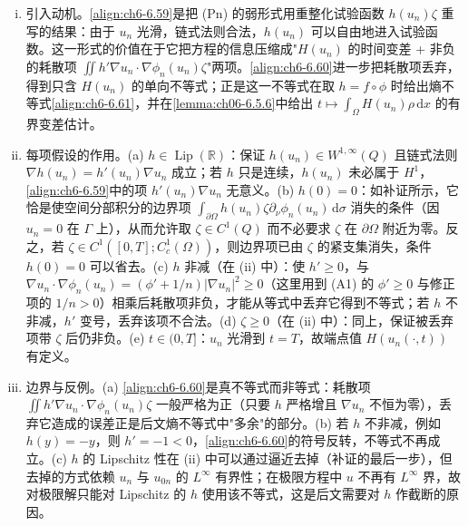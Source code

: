 \documentclass[../../main.tex]{subfiles}%
\begin{document}
\begin{remark}\label{remark:ch06-6.5.4动机}
\begin{enumerate}[(i)]
\item 引入动机。\eqref{align:ch6-6.59}是把 (Pn) 的弱形式用重整化试验函数 $h(u_n)\zeta$ 重写的结果：由于 $u_n$ 光滑，链式法则合法，$h(u_n)$ 可以自由地进入试验函数。这一形式的价值在于它把方程的信息压缩成"$H(u_n)$ 的时间变差 + 非负的耗散项 $\iint h'\nabla u_n\cdot\nabla\phi_n(u_n)\zeta$"两项。\eqref{align:ch6-6.60}进一步把耗散项丢弃，得到只含 $H(u_n)$ 的单向不等式；正是这一不等式在取 $h=f\circ\phi$ 时给出熵不等式\eqref{align:ch6-6.61}，并在\cref{lemma:ch06-6.5.6}中给出 $t\mapsto\int_\Omega H(u_n)\rho\,\mathrm{d}x$ 的有界变差估计。
\item 每项假设的作用。(a) $h\in\operatorname{Lip}(\mathbb{R})$：保证 $h(u_n)\in W^{1,\infty}(Q)$ 且链式法则 $\nabla h(u_n)=h'(u_n)\nabla u_n$ 成立；若 $h$ 只是连续，$h(u_n)$ 未必属于 $H^1$，\eqref{align:ch6-6.59}中的项 $h'(u_n)\nabla u_n$ 无意义。(b) $h(0)=0$：如补证所示，它恰是使空间分部积分的边界项 $\int_{\partial\Omega}h(u_n)\zeta\partial_\nu\phi_n(u_n)\,\mathrm{d}\sigma$ 消失的条件（因 $u_n=0$ 在 $\Gamma$ 上），从而允许取 $\zeta\in C^1(Q)$ 而不必要求 $\zeta$ 在 $\partial\Omega$ 附近为零。反之，若 $\zeta\in C^1([0,T];C^1_c(\Omega))$，则边界项已由 $\zeta$ 的紧支集消失，条件 $h(0)=0$ 可以省去。(c) $h$ 非减（在 (ii) 中）：使 $h'\geqslant0$，与 $\nabla u_n\cdot\nabla\phi_n(u_n)=(\phi'+1/n)|\nabla u_n|^2\geqslant0$（这里用到 (A1) 的 $\phi'\geqslant0$ 与修正项的 $1/n>0$）相乘后耗散项非负，才能从等式中丢弃它得到不等式；若 $h$ 不非减，$h'$ 变号，丢弃该项不合法。(d) $\zeta\geqslant0$（在 (ii) 中）：同上，保证被丢弃项带 $\zeta$ 后仍非负。(e) $t\in(0,T]$：$u_n$ 光滑到 $t=T$，故端点值 $H(u_n(\cdot,t))$ 有定义。
\item 边界与反例。(a) \eqref{align:ch6-6.60}是真不等式而非等式：耗散项 $\iint h'\nabla u_n\cdot\nabla\phi_n(u_n)\zeta$ 一般严格为正（只要 $h$ 严格增且 $\nabla u_n$ 不恒为零），丢弃它造成的误差正是后文熵不等式中"多余"的部分。(b) 若 $h$ 不非减，例如 $h(y)=-y$，则 $h'=-1<0$，\eqref{align:ch6-6.60}的符号反转，不等式不再成立。(c) $h$ 的 Lipschitz 性在 (ii) 中可以通过逼近去掉（补证的最后一步），但去掉的方式依赖 $u_n$ 与 $u_{0n}$ 的 $L^\infty$ 有界性；在极限方程中 $u$ 不再有 $L^\infty$ 界，故对极限解只能对 Lipschitz 的 $h$ 使用该不等式，这是后文需要对 $h$ 作截断的原因。
\end{enumerate}
\end{remark}
\end{document}
